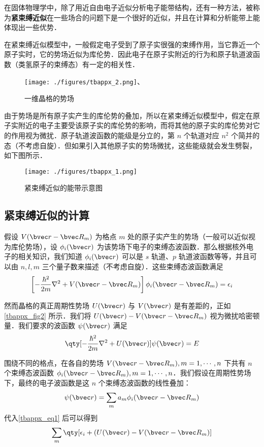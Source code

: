 

在固体物理学中，除了用近自由电子近似分析电子能带结构，还有一种方法，被称为\textbf{紧束缚近似}在一些场合的问题下是一个很好的近似，并且在计算和分析能带上能体现出一些优势．

在紧束缚近似模型中，一般假定电子受到了原子实很强的束缚作用，当它靠近一个原子实时，它的势场近似为库伦势．因此电子在原子实附近的行为和原子轨道波函数（类氢原子的束缚态）有一定的相关性．
\begin{figure}[ht]
\centering
\texttt{[image: ./figures/tbappx\_2.png]}、
\caption{一维晶格的势场} \label{tbappx_fig2}
\end{figure}


由于势场是所有原子实产生的库伦势的叠加，所以在紧束缚近似模型中，假定在原子实附近的电子主要受该原子实的库伦势的影响，而将其他的原子实的库伦势对它的作用视为微扰．原子轨道波函数的能级是分立的，第 $n$ 个轨道对应 $n^2$ 个简并的态（不考虑自旋）．但如果引入其他原子实的势场微扰，这些能级就会发生劈裂，如下图所示．

\begin{figure}[ht]
\centering
\texttt{[image: ./figures/tbappx\_1.png]}
\caption{紧束缚近似的能带示意图} \label{tbappx_fig1}
\end{figure}

\subsection{紧束缚近似的计算}

假设 $V(\bvec r-\bvec R_m)$ 为格点 $m$ 处的原子实产生的势场（一般可以近似视为库伦势场），设 $\phi_i(\bvec r)$ 为该势场下电子的束缚态波函数．那么根据核外电子的相关知识，我们知道 $\phi_i(\bvec r)$ 可以是 $s$ 轨道、$p$ 轨道波函数等等，并且可以由 $n,l,m$ 三个量子数来描述（不考虑自旋）．这些束缚态波函数满足
\begin{equation}
\left[-\frac{\hbar^2}{2m}\nabla^2+V(\bvec r-\bvec R_m)\right]\phi_i(\bvec r-\bvec R_m)=\epsilon_i
\end{equation}

然而晶格的真正周期性势场 $U(\bvec r)$ 与 $V(\bvec r)$ 是有差距的，正如 \autoref{tbappx_fig2} 所示．我们将 $U(\bvec r)-V(\bvec r-\bvec R_m)$ 视为微扰哈密顿量．我们要求的波函数 $\psi(\bvec r)$ 满足
\begin{equation}\label{tbappx_eq1}
\qty[-\frac{\hbar^2}{2m}\nabla^2+U(\bvec r)]\psi(\bvec r)=E
\end{equation}

围绕不同的格点，在各自的势场 $V(\bvec r-\bvec R_m),m=1,\cdots,n$ 下共有 $n$ 个束缚态波函数 $\phi_i(\bvec r-\bvec R_m),m=1,\cdots,n$．我们假设在周期性势场下，最终的电子波函数是这 $n$ 个束缚态波函数的线性叠加：
\begin{equation}
\psi(\bvec r)=\sum_{m} a_m \phi_i(\bvec r-\bvec R_m)
\end{equation}
代入\autoref{tbappx_eq1} 后可以得到
\begin{equation}
\sum_{m}\qty[\epsilon_i+(U(\bvec r)-V(\bvec r-\bvec R_m)]
\end{equation}
